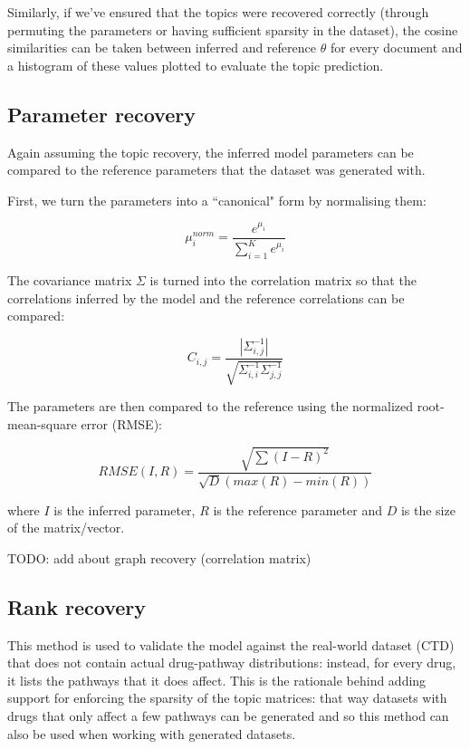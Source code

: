 \documentclass[12pt,a4paper,twoside,openright]{report}
\begin{document}
Similarly, if we've ensured that the topics were recovered correctly (through permuting the parameters or having sufficient sparsity in the dataset), the cosine similarities can be taken between inferred and reference $\theta$ for every document and a histogram of these values plotted to evaluate the topic prediction.

\subsection{Parameter recovery}

Again assuming the topic recovery, the inferred model parameters can be compared to the reference parameters that the dataset was generated with.

First, we turn the parameters into a ``canonical" form by normalising them:

\begin{equation}
\mu^{norm}_i = \frac{e^{\mu_i}}{\sum\limits_{i=1}^K{e^{\mu_i}}}
\end{equation}

The covariance matrix $\Sigma$ is turned into the correlation matrix so that the correlations inferred by the model and the reference correlations can be compared:

\begin{equation}
C_{i, j} = \frac{|\Sigma^{-1}_{i, j}|}{\sqrt{\Sigma^{-1}_{i, i}\Sigma^{-1}_{j, j}}}
\end{equation}

The parameters are then compared to the reference using the normalized root-mean-square error (RMSE):

\begin{equation}
\mathit{RMSE}(I, R) = \frac{\sqrt{\sum{(I-R)^2}}}{\sqrt{D}(max(R) - min(R))}
\end{equation}

where $I$ is the inferred parameter, $R$ is the reference parameter and $D$ is the size of the matrix/vector.

TODO: add about graph recovery (correlation matrix)

\subsection{Rank recovery}

This method is used to validate the model against the real-world dataset (CTD) that does not contain actual drug-pathway distributions: instead, for every drug, it lists the pathways that it does affect. This is the rationale behind adding support for enforcing the sparsity of the topic matrices: that way datasets with drugs that only affect a few pathways can be generated and so this method can also be used when working with generated datasets.
\end{document}
